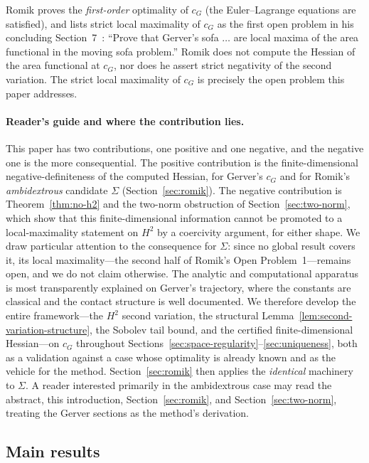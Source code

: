 \documentclass[11pt]{amsart}
\theoremstyle{plain}
\theoremstyle{definition}
\newcommand{\cG}{c_{G}}
\begin{document}
Romik proves the \emph{first-order} optimality of $\cG$ (the
Euler--Lagrange equations are satisfied), and lists strict local
maximality of $\cG$ as the first open problem in his concluding
Section~7~\cite[Open Problem~1, p.\,32]{Romik2018}:
``Prove that Gerver's sofa $\ldots$ are local maxima of the area
functional in the moving sofa problem.''  Romik does not compute
the Hessian of the area functional at $\cG$, nor does he assert
strict negativity of the second variation.  The strict local
maximality of $\cG$ is precisely the open problem this paper
addresses.

\paragraph{Reader's guide and where the contribution lies.}
This paper has two contributions, one positive and one negative, and
the negative one is the more consequential.  The positive
contribution is the finite-dimensional negative-definiteness of the
computed Hessian, for Gerver's $\cG$ and for Romik's
\emph{ambidextrous} candidate $\Sigma$ (Section~\ref{sec:romik}).
The negative contribution is Theorem~\ref{thm:no-h2} and the two-norm
obstruction of Section~\ref{sec:two-norm}, which show that this
finite-dimensional information cannot be promoted to a
local-maximality statement on $H^{2}$ by a coercivity argument, for
either shape.  We draw particular attention to the consequence for
$\Sigma$: since no global result covers it, its local maximality---the
second half of Romik's Open Problem~1---remains open, and we do not
claim otherwise.  The analytic and computational apparatus is
most transparently explained on Gerver's trajectory, where the
constants are classical and the contact structure is well documented.
We therefore develop the entire framework---the $H^{2}$ second
variation, the structural Lemma~\ref{lem:second-variation-structure},
the Sobolev tail bound, and the certified finite-dimensional
Hessian---on $\cG$ throughout Sections~\ref{sec:space-regularity}--\ref{sec:uniqueness},
both as a validation against a case whose optimality is already
known and as the vehicle for the method.
Section~\ref{sec:romik} then applies the \emph{identical} machinery
to $\Sigma$.  A reader interested
primarily in the ambidextrous case may read the abstract,
this introduction, Section~\ref{sec:romik}, and
Section~\ref{sec:two-norm}, treating the Gerver
sections as the method's derivation.

\subsection*{Main results}
\end{document}
